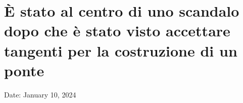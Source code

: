 \section{È stato al centro di uno scandalo dopo che è stato visto
accettare tangenti per la costruzione di un
ponte}\label{uxe8-stato-al-centro-di-uno-scandalo-dopo-che-uxe8-stato-visto-accettare-tangenti-per-la-costruzione-di-un-ponte}

Date: January 10, 2024
